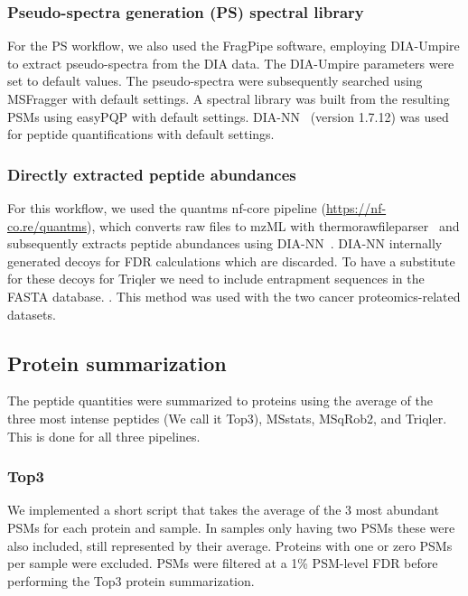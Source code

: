 \documentclass[10pt,letterpaper]{article}
\begin{document}
\subsubsection*{Pseudo-spectra generation (PS) spectral library}

For the PS workflow, we also used the FragPipe software, employing DIA-Umpire to extract pseudo-spectra from the DIA data. The DIA-Umpire parameters were set to default values. The pseudo-spectra were subsequently searched using MSFragger with default settings. A spectral library was built from the resulting PSMs using easyPQP with default settings. DIA-NN~\cite{demichev2020dia} (version 1.7.12) was used for peptide quantifications with default settings. 

\subsubsection*{Directly extracted peptide abundances}

For this workflow, we used the quantms nf-core pipeline (\url{https://nf-co.re/quantms}), which converts raw files to mzML with thermorawfileparser~\cite{hulstaert2019thermorawfileparser} and subsequently extracts peptide abundances using DIA-NN~\cite{hulstaert2019thermorawfileparser}. DIA-NN internally generated decoys for FDR calculations which are discarded. To have a substitute for these decoys for Triqler we need to include entrapment sequences in the FASTA database. \cite{granholm2013determining}. This method was used with the two cancer proteomics-related datasets.


\subsection*{Protein summarization}

The peptide quantities were summarized to proteins using the average of the three most intense peptides (We call it Top3), MSstats, MSqRob2, and Triqler. This is done for all three pipelines. 

\subsubsection*{Top3}

We implemented a short script that takes the average of the 3 most abundant PSMs for each protein and sample. In samples only having two PSMs these were also included, still represented by their average. Proteins with one or zero PSMs per sample were excluded. PSMs were filtered at a 1\% PSM-level FDR before performing the Top3 protein summarization. 
\end{document}
